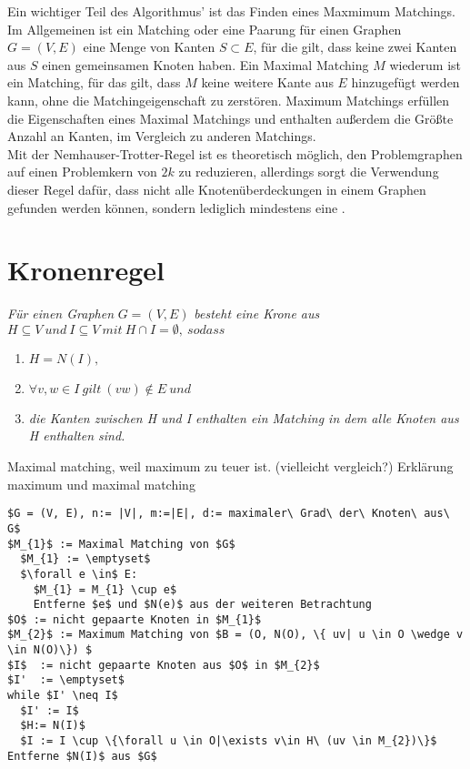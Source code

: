 Ein wichtiger Teil des Algorithmus' ist das Finden eines Maxmimum Matchings. Im Allgemeinen ist ein Matching oder eine Paarung für einen Graphen $G=(V,E)$ eine Menge von Kanten $S \subset E$, für die gilt, dass keine zwei Kanten aus $S$ einen gemeinsamen Knoten haben. Ein Maximal Matching $M$ wiederum ist ein Matching, für das gilt, dass $M$ keine weitere Kante aus $E$ hinzugefügt werden kann, ohne die Matchingeigenschaft zu zerstören. Maximum Matchings erfüllen die Eigenschaften eines Maximal Matchings und enthalten außerdem die Größte Anzahl an Kanten, im Vergleich zu anderen Matchings.\\
Mit der Nemhauser-Trotter-Regel ist es theoretisch möglich, den Problemgraphen auf einen Problemkern von $2k$ zu reduzieren, allerdings sorgt die Verwendung dieser Regel dafür, dass nicht alle Knotenüberdeckungen in einem Graphen gefunden werden können, sondern lediglich mindestens eine \cite{fixed}.
\section{Kronenregel}
\label{ch:Grundlagen:sec:Kronenregel}

\textit{Für einen Graphen} $G=(V,E)$ \textit{besteht eine Krone aus} $H \subseteq V\ und\ I \subseteq V\ mit\ H \cap I = \emptyset,\ sodass$ 
\begin{enumerate}
\item $H = N(I),$ 
\item $\forall v, w \in I\ gilt\ (vw) \notin E\ und$
\item \textit{die Kanten zwischen H und I enthalten ein Matching in dem alle Knoten aus H enthalten sind.}
\end{enumerate}

Maximal matching, weil maximum zu teuer ist. (vielleicht vergleich?)
Erklärung maximum und maximal matching
\begin{lstlisting}[mathescape=true, escapechar = !,basicstyle=\ttfamily]
$G = (V, E), n:= |V|, m:=|E|, d:= maximaler\ Grad\ der\ Knoten\ aus\ G$
$M_{1}$ := Maximal Matching von $G$
  $M_{1} := \emptyset$
  $\forall e \in$ E:
    $M_{1} = M_{1} \cup e$
    Entferne $e$ und $N(e)$ aus der weiteren Betrachtung
$O$ := nicht gepaarte Knoten in $M_{1}$
$M_{2}$ := Maximum Matching von $B = (O, N(O), \{ uv| u \in O \wedge v \in N(O)\}) $
$I$  := nicht gepaarte Knoten aus $O$ in $M_{2}$
$I'  := \emptyset$
while $I' \neq I$
  $I' := I$
  $H:= N(I)$
  $I := I \cup \{\forall u \in O|\exists v\in H\ (uv \in M_{2})\}$
Entferne $N(I)$ aus $G$
\end{lstlisting}


